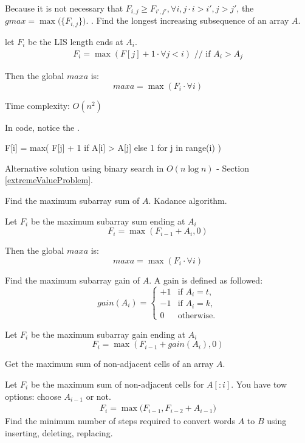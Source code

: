 Because it is not necessary that $F_{i,j}\geq F_{i',j'}, \forall i,j\cdot i>i', j>j'$, the $gmax=\max\big(\{{F_{i,j}\}}\big)$.
. Find the longest increasing subsequence of an array $A$.

let $F_i$ be the LIS length ends at $A_i$. 
\begin{eqnarray*}
F_i = \max(F[j]+1 \cdot\forall j < i) \text{ // if $A_i>A_j$}
\end{eqnarray*}

Then the global $maxa$ is:
$$
maxa = \max(F_i\cdot \forall i)
$$

Time complexity: $O(n^2)$

In code, notice the .
\begin{python}
F[i] = max(
    F[j] + 1 if A[i] > A[j] else 1
    for j in range(i)
)
\end{python}

Alternative solution using binary search in $O(n \log n)$ - Section \ref{extremeValueProblem}.

 Find the maximum subarray sum of $A$. Kadance algorithm.  

Let $F_i$  be the maximum subarray sum ending at $A_{i}$
$$
F_i = \max(F_{i-1}+A_{i}, 0)
$$

Then the global $maxa$ is:
$$
maxa = \max(F_i\cdot \forall i)
$$

 Find the maximum subarray gain of $A$. A gain is defined as followed:
\[
gain(A_i) = 
\begin{cases}
  +1 & \text{if } A_i = t, \\
  -1 & \text{if } A_i = k, \\
   0 & \text{otherwise}.
\end{cases}
\]


Let $F_i$  be the maximum subarray gain ending at $A_{i}$
$$
F_i = \max(F_{i-1}+gain(A_{i}), 0)
$$


 Get the maximum sum of non-adjacent
cells of an array $A$.

Let $F_i$ be the maximum sum of non-adjacent cells for $A[:i]$. You have tow options:
choose $A_{i-1}$ or not.
\begin{align*}
F_{i} = \max\big(F_{i-1}, F_{i-2}+A_{i-1}\big)
\end{align*}
 Find the minimum number of steps required to convert words $A$ to $B$ using inserting, deleting, replacing. 


